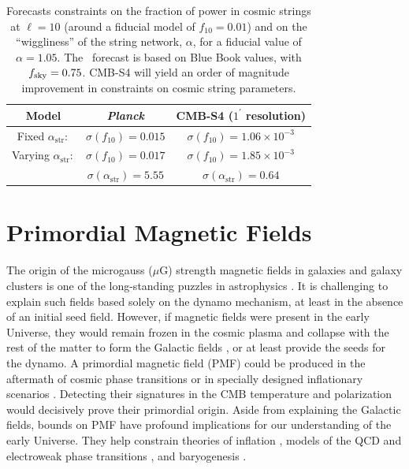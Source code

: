 \begin{table}[htbp!]\label{tab:string_forecast}
  \begin{center}
    \begin{tabular}{ | c || c | c  |}
      \hline
       Model & {\it Planck} & CMB-S4 ($1^\prime$ resolution)  \\ \hline \hline
       Fixed $\alpha_\mathrm{str}:$ & $\sigma(f_{10})= 0.015$ & $\sigma(f_{10})=1.06\times 10^{-3}$  \\ \hline
       Varying $\alpha_\mathrm{str}:$ & $\sigma(f_{10})= 0.017$ & $\sigma(f_{10})=1.85\times 10^{-3}$ \\
        & $\sigma(\alpha_\mathrm{str})= 5.55$ & $\sigma(\alpha_\mathrm{str})=0.64$ \\\hline
    \end{tabular}
  \end{center}
  \caption{Forecasts constraints on the fraction of power in cosmic strings at $\ell=10$ (around a fiducial model of $f_{10}=0.01$) and on the ``wiggliness'' of the string network, $\alpha$, for a fiducial value of $\alpha=1.05$. The \planck\ forecast is based on Blue Book values, with $f_{\rm sky} = 0.75$. CMB-S4 will yield an order of magnitude improvement in constraints on cosmic string parameters.}
\end{table}


\section{Primordial Magnetic Fields}
\label{sec:PMF}
The origin of the microgauss ($\mu$G) strength magnetic fields in galaxies and galaxy clusters is one of the long-standing puzzles in astrophysics \cite{Durrer:2013pga}. It is challenging to explain such fields based solely on the dynamo mechanism, at least in the absence of an initial seed field. However, if magnetic fields were present in the early Universe, they would remain frozen in the cosmic plasma and collapse with the rest of the matter to form the Galactic fields \cite{Grasso:2000wj}, or at least provide the seeds for the dynamo. A primordial magnetic field (PMF) could be produced in the aftermath of cosmic phase transitions \cite{Vachaspati:1991nm} or in specially designed inflationary scenarios \cite{Turner:1987bw,Ratra:1991bn}. Detecting their signatures in the CMB temperature and polarization would decisively prove their primordial origin. Aside from explaining the Galactic fields, bounds on PMF have profound implications for our understanding of the early Universe.  They help constrain theories of inflation \cite{Bonvin:2011dt}, models of the QCD and electroweak phase transitions \cite{Caprini:2007xq}, and baryogenesis \cite{Vachaspati:2001nb}.

